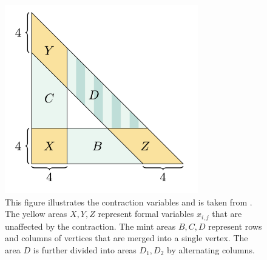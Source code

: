 \begin{figure}[H]\label{fig:contractions-42342432}
    \centering
    \includegraphics[width=0.75\textwidth]{assets/contactions-4.png}
    \caption{This figure illustrates the contraction variables and is taken from \cite{bik2022classifying}. The yellow areas \( X, Y, Z \) represent formal variables \( x_{i,j} \) that are unaffected by the contraction. The mint areas \( B, C, D \) represent rows and columns of vertices that are merged into a single vertex. The area \( D \) is further divided into areas \( D_1, D_2 \) by alternating columns.}
\end{figure}

